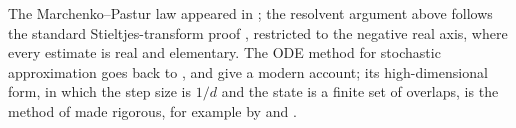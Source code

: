 \begin{refsection}
The Marchenko--Pastur law appeared in \textcite{MarchenkoPastur1967}; the resolvent argument above follows the standard Stieltjes-transform proof \parencite{BaiSilverstein2010}, restricted to the negative real axis, where every estimate is real and elementary. The ODE method for stochastic approximation goes back to \textcite{Ljung1977}, and \textcite{KushnerYin2003} give a modern account; its high-dimensional form, in which the step size is $1/d$ and the state is a finite set of overlaps, is the method of \textcite{SaadSolla1995} made rigorous, for example by \textcite{WangMattinglyLu2017} and \textcite{GoldtEtAl2019}.

\printchapterbib
\end{refsection}
